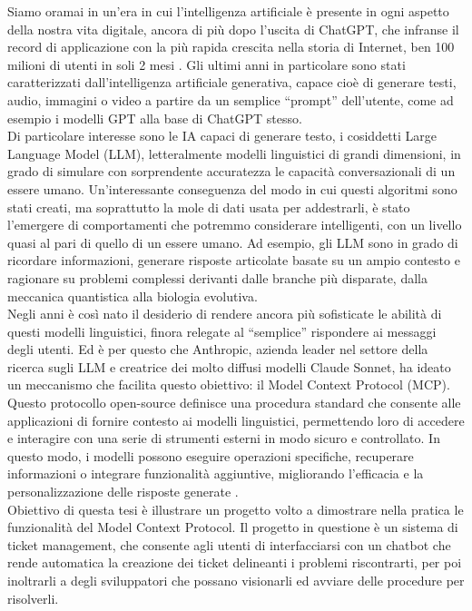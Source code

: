 ﻿Siamo oramai in un'era in cui l'intelligenza artificiale è presente in ogni aspetto della nostra vita digitale, ancora di più dopo l'uscita di ChatGPT, che infranse il record di applicazione con la più rapida crescita nella storia di Internet, ben 100 milioni di utenti in soli 2 mesi \cite{ubs2023latest}. Gli ultimi anni in particolare sono stati caratterizzati dall’intelligenza artificiale generativa, capace cioè di generare testi, audio, immagini o video a partire da un semplice “prompt” dell’utente, come ad esempio i modelli GPT alla base di ChatGPT stesso. \\
Di particolare interesse sono le IA capaci di generare testo, i cosiddetti Large Language Model (LLM), letteralmente modelli linguistici di grandi dimensioni, in grado di simulare con sorprendente accuratezza le capacità conversazionali di un essere umano. Un'interessante conseguenza del modo in cui questi algoritmi sono stati creati, ma soprattutto la mole di dati usata per addestrarli, è stato l’emergere di comportamenti che potremmo considerare intelligenti, con un livello quasi al pari di quello di un essere umano. Ad esempio, gli LLM sono in grado di ricordare informazioni, generare risposte articolate basate su un ampio contesto e ragionare su problemi complessi derivanti dalle branche più disparate, dalla meccanica quantistica alla biologia evolutiva. \\
Negli anni è così nato il desiderio di rendere ancora più sofisticate le abilità di questi modelli linguistici, finora relegate al “semplice” rispondere ai messaggi degli utenti. Ed è per questo che Anthropic, azienda leader nel settore della ricerca sugli LLM e creatrice dei molto diffusi modelli Claude Sonnet, ha ideato un meccanismo che facilita questo obiettivo: il Model Context Protocol (MCP). Questo protocollo open-source definisce una procedura standard che consente alle applicazioni di fornire contesto ai modelli linguistici, permettendo loro di accedere e interagire con una serie di strumenti esterni in modo sicuro e controllato. In questo modo, i modelli possono eseguire operazioni specifiche, recuperare informazioni o integrare funzionalità aggiuntive, migliorando l’efficacia e la personalizzazione delle risposte generate \cite{modelcontextprotocol2023}. \\
Obiettivo di questa tesi è illustrare un progetto volto a dimostrare nella pratica le funzionalità del Model Context Protocol. Il progetto in questione è un sistema di ticket management, che consente agli utenti di interfacciarsi con un chatbot che rende automatica la creazione dei ticket delineanti i problemi riscontrarti, per poi inoltrarli a degli sviluppatori che possano visionarli ed avviare delle procedure per risolverli.
